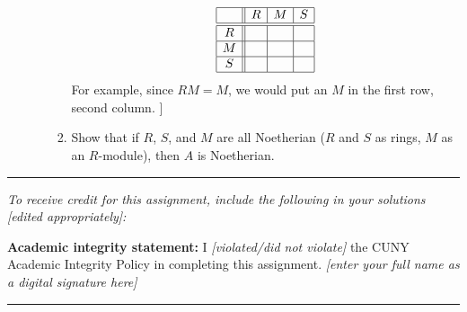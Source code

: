 \documentclass[11pt, reqno]{amsart}
\theoremstyle{plain}
\theoremstyle{definition}
\theoremstyle{example}
\begin{document}
\begin{enumerate}[1.]
\begin{enumerate}
\begin{enumerate}
{	$$\begin{array}{|c||c|c|c|}\hline&R&M&S\\\hline\hline R&&&\\\hline M&&&\\\hline S&&&\\\hline\end{array}$$
For example, since $RM = M$, we would put an $M$ in the first row, second column. 
]}
\item Show that if $R$, $S$, and $M$ are all Noetherian ($R$ and $S$ as rings, $M$ as an $R$-module), then $A$ is Noetherian.
\end{enumerate}

\end{enumerate}
\end{enumerate}

\vfill


\hrule
\emph{\small To receive credit for this assignment, include the following in your solutions [edited appropriately]:}

\smallskip

\textbf{Academic integrity statement:} I \emph{[violated/did not violate]} the CUNY Academic Integrity Policy in completing this assignment. \hfill \emph{[enter your full name as a digital signature here]}

\medskip
\hrule

\vfill
\end{document}
